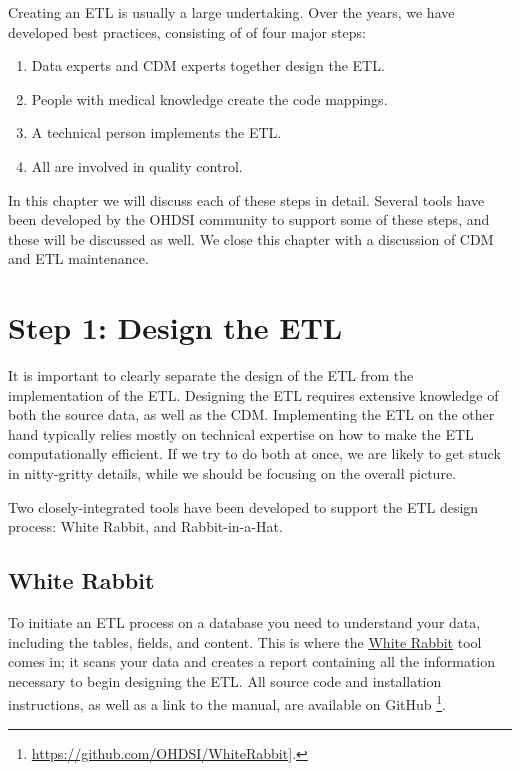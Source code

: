 \documentclass[11pt]{book}
\providecommand{\tightlist}{%
  \setlength{\itemsep}{0pt}\setlength{\parskip}{0pt}}
\let\rmarkdownfootnote\footnote%
\def\footnote{\protect\rmarkdownfootnote}
\theoremstyle{definition}
\theoremstyle{definition}
\theoremstyle{definition}
\theoremstyle{remark}
\begin{document}
Creating an ETL is usually a large undertaking. Over the years, we have developed best practices, consisting of of four major steps:

\begin{enumerate}
\def\labelenumi{\arabic{enumi}.}
\tightlist
\item
  Data experts and CDM experts together design the ETL.
\item
  People with medical knowledge create the code mappings.
\item
  A technical person implements the ETL.
\item
  All are involved in quality control.
\end{enumerate}

In this chapter we will discuss each of these steps in detail. Several tools have been developed by the OHDSI community to support some of these steps, and these will be discussed as well. We close this chapter with a discussion of CDM and ETL maintenance.

\hypertarget{step-1-design-the-etl}{%
\section{Step 1: Design the ETL}\label{step-1-design-the-etl}}

It is important to clearly separate the design of the ETL from the implementation of the ETL. Designing the ETL requires extensive knowledge of both the source data, as well as the CDM. Implementing the ETL on the other hand typically relies mostly on technical expertise on how to make the ETL computationally efficient. If we try to do both at once, we are likely to get stuck in nitty-gritty details, while we should be focusing on the overall picture.

Two closely-integrated tools have been developed to support the ETL design process: White Rabbit, and Rabbit-in-a-Hat.

\hypertarget{white-rabbit}{%
\subsection{White Rabbit}\label{white-rabbit}}

To initiate an ETL process on a database you need to understand your data, including the tables, fields, and content. This is where the \href{https://github.com/OHDSI/WhiteRabbit}{White Rabbit} tool comes in; it scans your data and creates a report containing all the information necessary to begin designing the ETL. All source code and installation instructions, as well as a link to the manual, are available on GitHub \footnote{\url{https://github.com/OHDSI/WhiteRabbit}{]}.}.  
\end{document}
